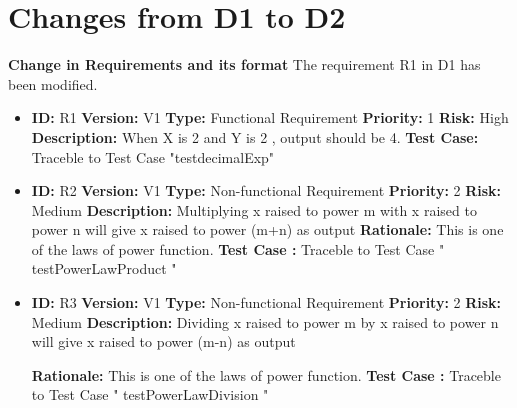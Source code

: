 \documentclass[12pt]{report}
\begin{document}
\tableofcontents
\pagebreak

\renewcommand{\thesection}{\arabic{section}}
\section{Changes from D1 to D2}

   \textbf{Change in Requirements and its format} \large
    \newline The requirement R1 in D1 has been modified.\\

\begin{itemize}
    \item \textbf{ID:} R1
    \newline \textbf {Version:} V1
    \newline \textbf{Type:} Functional Requirement
    \newline \textbf{Priority:} 1
    \newline \textbf{Risk:} High
    \newline \textbf{Description:} When X is 2 and Y is 2 , output should be 4.
    \newline \textbf{Test Case:} Traceble to Test Case "testdecimalExp"
    \\
    
     
   
    \item \textbf{ID:} R2
    \newline \textbf {Version:} V1
    \newline \textbf{Type:} Non-functional Requirement
    \newline \textbf{Priority:} 2
    \newline \textbf{Risk:} Medium
    \newline \textbf{Description:} Multiplying x raised to power m with x raised to power n will give x raised to power (m+n)  as output
    \newline \textbf{Rationale:} This is one of the laws of power function.
    \newline \textbf{Test Case :} Traceble to Test Case " testPowerLawProduct " 
    
    
     \item \textbf{ID:} R3
    \newline \textbf {Version:} V1
    \newline \textbf{Type:} Non-functional Requirement
    \newline \textbf{Priority:} 2
    \newline \textbf{Risk:} Medium
    \newline \textbf{Description:} Dividing x raised to power m by x raised to power n will give x raised to power (m-n) as output 
    
    \newline \textbf{Rationale:} This is one of the laws of power function.
     \newline \textbf{Test Case :} Traceble to Test Case " testPowerLawDivision " 
    
     
\end{itemize}
\end{document}

